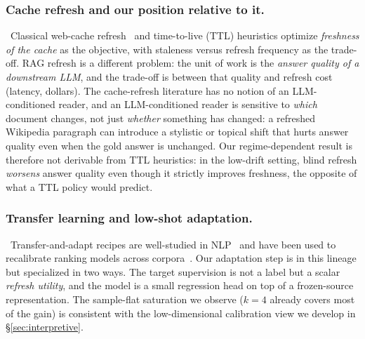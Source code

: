 \documentclass[pdflatex,sn-basic]{sn-jnl}
\begin{document}
\subsubsection*{Cache refresh and our position relative to it.}~Classical web-cache refresh~\cite{bingyuan2017cache} and time-to-live (TTL) heuristics optimize \emph{freshness of the cache} as the objective, with staleness versus refresh frequency as the trade-off. RAG refresh is a different problem: the unit of work is the \emph{answer quality of a downstream LLM}, and the trade-off is between that quality and refresh cost (latency, dollars). The cache-refresh literature has no notion of an LLM-conditioned reader, and an LLM-conditioned reader is sensitive to \emph{which} document changes, not just \emph{whether} something has changed: a refreshed Wikipedia paragraph can introduce a stylistic or topical shift that hurts answer quality even when the gold answer is unchanged. Our regime-dependent result is therefore not derivable from TTL heuristics: in the low-drift setting, blind refresh \emph{worsens} answer quality even though it strictly improves freshness, the opposite of what a TTL policy would predict.

\subsubsection*{Transfer learning and low-shot adaptation.}~Transfer-and-adapt recipes are well-studied in NLP~\cite{howard2018ulmfit,devlin2019bert} and have been used to recalibrate ranking models across corpora~\cite{thakur2021beir}. Our adaptation step is in this lineage but specialized in two ways. The target supervision is not a label but a scalar \emph{refresh utility}, and the model is a small regression head on top of a frozen-source representation. The sample-flat saturation we observe ($k{=}4$ already covers most of the gain) is consistent with the low-dimensional calibration view we develop in §\ref{sec:interpretive}.
\end{document}
